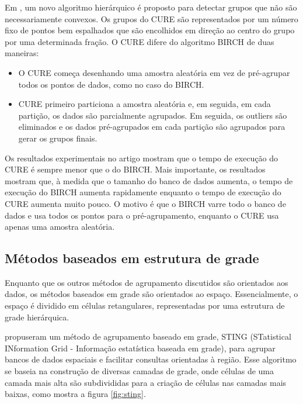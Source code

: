 Em \cite{Guha1998}, um novo algoritmo hierárquico é proposto para detectar grupos que não são necessariamente convexos. Os grupos do CURE são representados por um número fixo de pontos bem espalhados que são encolhidos em direção ao centro do grupo por uma determinada fração. O CURE difere do algoritmo BIRCH de duas maneiras:
\begin{itemize}
\item O CURE começa desenhando uma amostra aleatória em vez de pré-agrupar todos os pontos de dados, como no caso do BIRCH.
\item CURE primeiro particiona a amostra aleatória e, em seguida, em cada partição, os dados são parcialmente agrupados. Em seguida, os outliers são eliminados e os dados pré-agrupados em cada partição são agrupados para gerar os grupos finais.
\end{itemize}
Os resultados experimentais no artigo mostram que o tempo de execução do CURE é sempre menor que o do BIRCH. Mais importante, os resultados mostram que, à medida que o tamanho do banco de dados aumenta, o tempo de execução do BIRCH aumenta rapidamente enquanto o tempo de execução do CURE aumenta muito pouco. O motivo é que o BIRCH varre todo o banco de dados e usa todos os pontos para o pré-agrupamento, enquanto o CURE usa apenas uma amostra aleatória.

\subsection{Métodos baseados em estrutura de grade}
Enquanto que os outros métodos de agrupamento discutidos são orientados aos dados, os métodos baseados em grade são orientados ao espaço. Essencialmente, o espaço é dividido em células retangulares, representadas por uma estrutura de grade hierárquica.

\cite{Wang1997} propuseram um método de agrupamento baseado em grade, STING (STatistical INformation Grid - Informação estatística baseada em grade), para agrupar bancos de dados espaciais e facilitar consultas orientadas à região. Esse algoritmo se baseia na construção de diversas camadas de grade, onde células de uma camada mais alta são subdivididas para a criação de células nas camadas mais baixas, como mostra a figura \ref{fig:sting}.

\begin{figure}[!h]
	\centering	
\end{figure}

